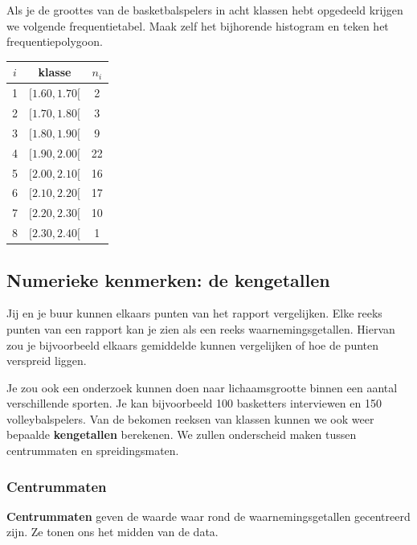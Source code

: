 \documentclass[12pt,twoside]{article}
\begin{document}
\begin{oefening}
Als je de groottes van de basketbalspelers in acht klassen hebt opgedeeld krijgen we volgende frequentietabel. Maak zelf het bijhorende histogram en teken het frequentiepolygoon.\\
\begin{center}
\begin{tabular}{c|c|c}
$i$ & klasse     & $n_i$\\
\hline
  1 & $[ 1.60,  1.70[$ &   2\\
  2 & $[ 1.70,  1.80[$ &   3\\
  3 & $[ 1.80,  1.90[$ &   9\\
  4 & $[ 1.90,  2.00[$ &   22\\
  5 & $[ 2.00,  2.10[$ &   16\\
  6 & $[ 2.10,  2.20[$ &   17\\
  7 & $[ 2.20,  2.30[$ &   10\\
  8 & $[ 2.30,  2.40[$ &   1\\
\end{tabular}
\end{center}
\end{oefening}

\subsection{Numerieke kenmerken: de kengetallen}

Jij en je buur kunnen elkaars punten van het rapport vergelijken. Elke reeks punten van een rapport kan je zien als een reeks waarnemingsgetallen. Hiervan zou je bijvoorbeeld elkaars gemiddelde kunnen vergelijken of hoe de punten verspreid liggen.

Je zou ook een onderzoek kunnen doen naar lichaamsgrootte binnen een aantal verschillende sporten. Je kan bijvoorbeeld 100 basketters interviewen en 150 volleybalspelers. Van de bekomen reeksen van klassen kunnen we ook weer bepaalde {\bf kengetallen} berekenen. We zullen onderscheid maken tussen centrummaten en spreidingsmaten.

\subsubsection{Centrummaten}

{\bf Centrummaten} geven de waarde waar rond de waarnemingsgetallen gecentreerd zijn. Ze tonen ons het midden van de data.
\end{document}
